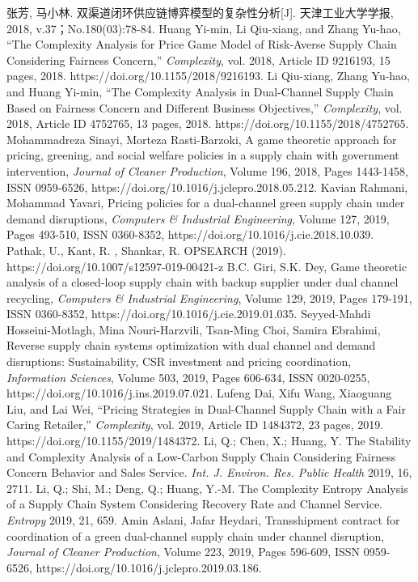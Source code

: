 \documentclass{article}
\begin{document}
\begin{thebibliography}{1}
 张芳, 马小林. 双渠道闭环供应链博弈模型的复杂性分析[J]. 天津工业大学学报, 2018, v.37；No.180(03):78-84.
 Huang Yi-min, Li Qiu-xiang, and Zhang Yu-hao, “The Complexity Analysis for Price Game Model of Risk-Averse Supply Chain Considering Fairness Concern,” \emph{Complexity}, vol. 2018, Article ID 9216193, 15 pages, 2018. https://doi.org/10.1155/2018/9216193.
 Li Qiu-xiang, Zhang Yu-hao, and Huang Yi-min, “The Complexity Analysis in Dual-Channel Supply Chain Based on Fairness Concern and Different Business Objectives,” \emph{Complexity}, vol. 2018, Article ID 4752765, 13 pages, 2018. https://doi.org/10.1155/2018/4752765.
 Mohammadreza Sinayi, Morteza Rasti-Barzoki, A game theoretic approach for pricing, greening, and social welfare policies in a supply chain with government intervention, \emph{Journal of Cleaner Production}, Volume 196, 2018, Pages 1443-1458, ISSN 0959-6526, https://doi.org/10.1016/j.jclepro.2018.05.212.
 Kavian Rahmani, Mohammad Yavari, Pricing policies for a dual-channel green supply chain under demand disruptions, \emph{Computers \& Industrial Engineering}, Volume 127, 2019, Pages 493-510, ISSN 0360-8352, https://doi.org/10.1016/j.cie.2018.10.039.
 Pathak, U., Kant, R. , Shankar, R. OPSEARCH (2019). https://doi.org/10.1007/s12597-019-00421-z
 B.C. Giri, S.K. Dey, Game theoretic analysis of a closed-loop supply chain with backup supplier under dual channel recycling, \emph{Computers \& Industrial Engineering}, Volume 129, 2019, Pages 179-191, ISSN 0360-8352, https://doi.org/10.1016/j.cie.2019.01.035. 
 Seyyed-Mahdi Hosseini-Motlagh, Mina Nouri-Harzvili, Tsan-Ming Choi, Samira Ebrahimi, Reverse supply chain systems optimization with dual channel and demand disruptions: Sustainability, CSR investment and pricing coordination, \emph{Information Sciences}, Volume 503, 2019, Pages 606-634, ISSN 0020-0255, https://doi.org/10.1016/j.ins.2019.07.021.
 Lufeng Dai, Xifu Wang, Xiaoguang Liu, and Lai Wei, “Pricing Strategies in Dual-Channel Supply Chain with a Fair Caring Retailer,” \emph{Complexity}, vol. 2019, Article ID 1484372, 23 pages, 2019. https://doi.org/10.1155/2019/1484372.
 Li, Q.; Chen, X.; Huang, Y. The Stability and Complexity Analysis of a Low-Carbon Supply Chain Considering Fairness Concern Behavior and Sales Service. \emph{Int. J. Environ. Res. Public Health} 2019, 16, 2711.
 Li, Q.; Shi, M.; Deng, Q.; Huang, Y.-M. The Complexity Entropy Analysis of a Supply Chain System Considering Recovery Rate and Channel Service. \emph{Entropy} 2019, 21, 659.
 Amin Aslani, Jafar Heydari, Transshipment contract for coordination of a green dual-channel supply chain under channel disruption, \emph{Journal of Cleaner Production}, Volume 223, 2019, Pages 596-609, ISSN 0959-6526, https://doi.org/10.1016/j.jclepro.2019.03.186.

\end{thebibliography}
\end{document}
